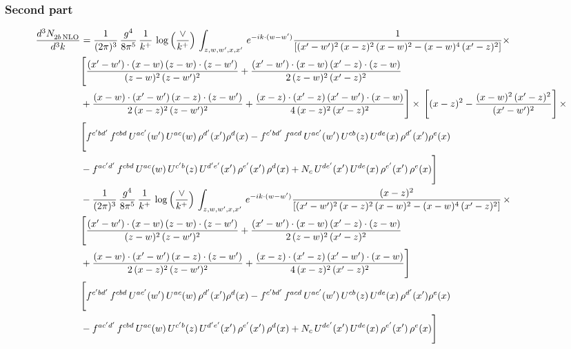 \documentclass[9pt]{article}
\numberwithin{equation}{section}
\begin{document}
\subsubsection{Second part}
\begin{align}
    \frac{d^{3}N_{2b\,\rm NLO}^{\rm}}{d^{3}k}  & =  \frac{1}{(2\pi)^{3}}\, \frac{g^{4}}{8\pi^{5}}\,\frac{1}{k^{+}}\,\log{\left(\frac{\vee}{k^{+}}\right)}\,\int_{z,w,w^{\prime},x,x'}\, e^{-ik\cdot (w-w')} \frac{1}{\left[(x'-w')^{2}\,(x-z)^{2}\,(x-w)^{2} - (x-w)^{4}\, (x'-z)^{2}\right]} \times\notag \\ & \Bigg[\frac{(x'-w')\cdot (x-w)\, (z-w)\cdot (z-w')}{(z-w)^{2}\, (z-w')^{2}}+\frac{(x'-w')\cdot (x-w)\, (x'-z)\cdot (z-w)}{2\, (z-w)^{2}\, (x'-z)^{2}}\notag \\ & +\frac{(x-w)\cdot (x'-w')\, (x-z)\cdot (z-w')}{2\, (x-z)^{2}\, (z-w')^{2}}+\frac{(x-z)\cdot (x'-z)\, (x'-w')\cdot (x-w)}{4\, (x-z)^{2}\, (x'-z)^{2}}\Bigg] \times\,\Bigg[(x-z)^{2} - \frac{(x-w)^{2}\, (x'-z)^{2}}{(x'-w')^{2}}\Bigg]\,\times \notag \\ & \Bigg[f^{c'bd'}\,f^{cbd}\, U^{ac'}(w')\,U^{ac}(w)\,\rho^{d'}(x')\rho^{d}(x)- f^{c'bd'}\,f^{acd}\,U^{ac'}(w')\,U^{cb}(z)\,U^{de}(x)\,\rho^{d'}(x')\rho^{e}(x) \notag \\ & -f^{ac'd'}\,f^{cbd}\,U^{ac}(w)\,U^{c'b}(z)\,U^{d'e'}(x')\,\rho^{e'}(x')\,\rho^{d}(x) +N_{c}\,U^{de'}(x')\,U^{de}(x)\,\rho^{e'}(x')\,\rho^{e}(x)\Bigg] \notag \\
&  - \frac{1}{(2\pi)^{3}}\, \frac{g^{4}}{8\pi^{5}}\,\frac{1}{k^{+}}\,\log{\left(\frac{\vee}{k^{+}}\right)}\,\int_{z,w,w^{\prime},x,x'}\, e^{-ik\cdot (w-w')} \frac{(x-z)^{2}}{\left[(x'-w')^{2}\,(x-z)^{2}\,(x-w)^{2} - (x-w)^{4}\, (x'-z)^{2}\right]}\,  \times\notag \\ & \Bigg[\frac{(x'-w')\cdot (x-w)\, (z-w)\cdot (z-w')}{(z-w)^{2}\, (z-w')^{2}}+\frac{(x'-w')\cdot (x-w)\, (x'-z)\cdot (z-w)}{2\, (z-w)^{2}\, (x'-z)^{2}}\notag \\ & +\frac{(x-w)\cdot (x'-w')\, (x-z)\cdot (z-w')}{2\, (x-z)^{2}\, (z-w')^{2}}+\frac{(x-z)\cdot (x'-z)\, (x'-w')\cdot (x-w)}{4\, (x-z)^{2}\, (x'-z)^{2}}\Bigg] \notag \\ & \Bigg[f^{c'bd'}\,f^{cbd}\, U^{ac'}(w')\,U^{ac}(w)\,\rho^{d'}(x')\rho^{d}(x)- f^{c'bd'}\,f^{acd}\,U^{ac'}(w')\,U^{cb}(z)\,U^{de}(x)\,\rho^{d'}(x')\rho^{e}(x) \notag \\ & -f^{ac'd'}\,f^{cbd}\,U^{ac}(w)\,U^{c'b}(z)\,U^{d'e'}(x')\,\rho^{e'}(x')\,\rho^{d}(x) +N_{c}\,U^{de'}(x')\,U^{de}(x)\,\rho^{e'}(x')\,\rho^{e}(x)\Bigg] \notag \\

\end{align}
\end{document}
